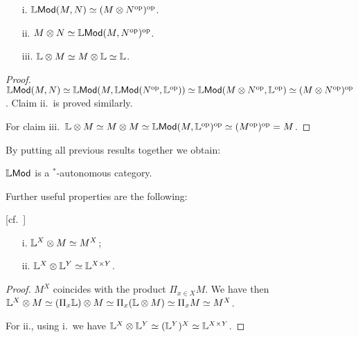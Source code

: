 \begin{proposition}
\begin{itemize}
\item[i.] $\mathbb{L}\mathsf{Mod}(M,N)\simeq (M\otimes N^{\mathrm{op}})^{\mathrm{op}}$.
\item[ii.] $M\otimes N\simeq \mathbb{L}\mathsf{Mod}(M, N^{\mathrm{op}})^{\mathrm{op}}$.
\item[iii.] $\mathbb{L}\otimes  M \simeq M\otimes \mathbb{L}\simeq \mathbb{L}$.
\end{itemize}
\end{proposition}
\begin{proof}
$\mathbb{L}\mathsf{Mod}(M,N)\simeq \mathbb{L}\mathsf{Mod}(M, \mathbb{L}\mathsf{Mod}(N^{\mathrm{op}},\mathbb{L}^{\mathrm{op}}))
\simeq \mathbb{L}\mathsf{Mod}(M\otimes N^{\mathrm{op}},\mathbb{L}^{\mathrm{op}})\simeq
(M\otimes N^{\mathrm{op}})^{\mathrm{op}}$.
Claim ii.~is proved similarly.

For claim iii.~$\mathbb{L}\otimes M\simeq M\otimes M\simeq \mathbb{L}\mathsf{Mod}(M, \mathbb{L}^{\mathrm{op}})^{\mathrm{op}}\simeq (M^{\mathrm{op}})^{\mathrm{op}}=M$. 
\end{proof}


By putting all previous results together we obtain:
\begin{theorem}
$\mathbb{L}\mathsf{Mod}$ is a $^{*}$-autonomous category.
\end{theorem}


Further useful properties are the following:


\begin{proposition}\label{prop:Qtensor}[cf.~\cite{Russo2007}]
\begin{itemize}
\item[i.] $\mathbb{L}^{X}\otimes M \simeq M^{X}$;
\item[ii.] $\mathbb{L}^{X}\otimes \mathbb{L}^{Y}\simeq \mathbb{L}^{X\times Y}$.
\end{itemize}
\end{proposition}
\begin{proof}
$M^{X}$ coincides with the product $\Pi_{x\in X}M$. We have then 
$\mathbb{L}^{X}\otimes M \simeq (\Pi_{x}\mathbb{L})\otimes M \simeq \Pi_{x}(\mathbb{L}\otimes M) \simeq \Pi_{x}M\simeq M^{X}$.

For ii., using i.~we have $\mathbb{L}^{X}\otimes \mathbb{L}^{Y}\simeq( \mathbb{L}^{Y})^{X}\simeq \mathbb{L}^{X\times Y}$.
\end{proof}



